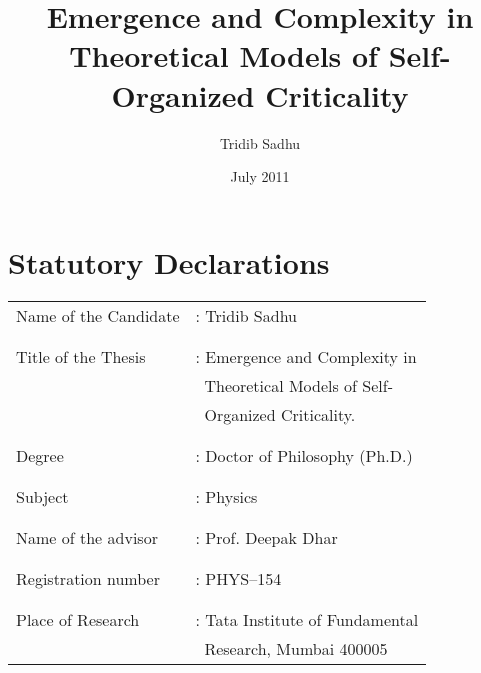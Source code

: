 \documentclass[11pt,a4paper]{book}
\begin{document}
\author{Tridib Sadhu}
\title{Emergence and Complexity in Theoretical Models of
Self-Organized Criticality }
\date{July 2011}
\maketitle
%



\chapter*{Statutory Declarations}
\begin{tabular}{p{2.2in}p{3in}}
Name of the Candidate &: Tridib Sadhu\\
\\ & \\
Title of the Thesis &: Emergence and Complexity in\\
& $~$ Theoretical Models of Self-\\
& $~$ Organized Criticality.\\
\\ & \\
Degree &: Doctor of Philosophy (Ph.D.)\\
\\ & \\
Subject &: Physics \\
\\ & \\
Name of the advisor &: Prof. Deepak Dhar\\
\\ & \\
Registration number &: PHYS--154\\
\\ & \\
Place of Research &: Tata Institute of Fundamental\\
 & $~$ Research, Mumbai
400005
\end{tabular}
\end{document}
